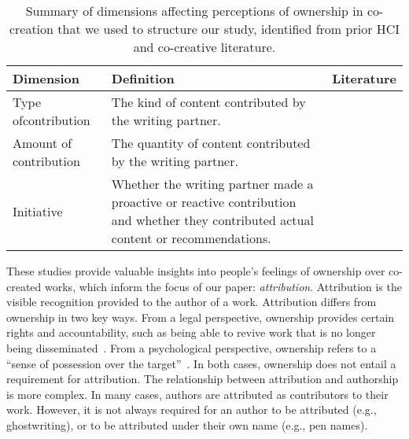 \begin{table}[htp]
    \centering
    \small
    \begin{tabularx}{\linewidth}{p{1.5cm}XX}
        \toprule
        \textbf{Dimension} & \textbf{Definition} & \textbf{Literature} \\
        \midrule
        Type of\newline contribution & The kind of content contributed by the writing partner. & \citet{he2024ai, rezwana2023user, wan2024coco, xu2024makes} \\
        \midrule
        Amount of contribution & The quantity of content contributed by the writing partner. & \citet{lee2022coauthor}  \\
        \midrule
        Initiative & Whether the writing partner made a proactive or reactive contribution and whether they contributed actual content or recommendations. & \citet{lee2024design, rezwana2023user, wan2024coco}  \\
        \bottomrule
    \end{tabularx}
    \caption{Summary of dimensions affecting perceptions of ownership in co-creation that we used to structure our study, identified from prior HCI and co-creative literature.}
    \label{tab:contribution-dimensions}
\end{table}

These studies provide valuable insights into people's feelings of ownership over co-created works, which inform the focus of our paper: \emph{attribution}. Attribution is the visible recognition provided to the author of a work. Attribution differs from ownership in two key ways. From a legal perspective, ownership provides certain rights and accountability, such as being able to revive work that is no longer being disseminated~\cite{van2016authors}. From a psychological perspective, ownership refers to a ``sense of possession over the target''~\cite{xu2024makes}. In both cases, ownership does not entail a requirement for attribution. The relationship between attribution and authorship is more complex. In many cases, authors are attributed as contributors to their work. However, it is not always required for an author to be attributed (e.g., ghostwriting), or to be attributed under their own name (e.g., pen names).

